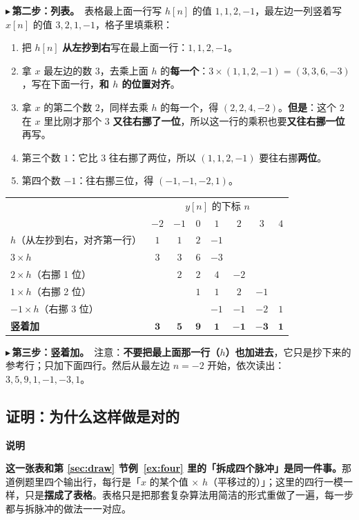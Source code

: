\documentclass[UTF8,a4paper,11pt]{ctexart}
\newenvironment{note}{\begin{notebox}\textbf{说明}\par\smallskip}{\end{notebox}}
\newcounter{ex}[section]
\newcommand{\point}[1]{\par\addvspace{1ex}\noindent\textcolor{ptteal}{$\blacktriangleright$\,\textbf{#1}}\ }
\begin{document}
\point{第二步：列表。}表格最上面一行写 $h[n]$ 的值 $1,1,2,-1$，最左边一列竖着写 $x[n]$ 的值 $3,2,1,-1$，格子里填乘积：
\begin{enumerate}[nosep]
\item 把 $h[n]$ \textbf{从左抄到右}写在最上面一行：$1,1,2,-1$。
\item 拿 $x$ 最左边的数 $3$，去乘上面 $h$ 的\textbf{每一个}：$3\times(1,1,2,-1)=(3,3,6,-3)$，写在下面一行，\textbf{和 $h$ 的位置对齐}。
\item 拿 $x$ 的第二个数 $2$，同样去乘 $h$ 的每一个，得 $(2,2,4,-2)$。\textbf{但是}：这个 $2$ 在 $x$ 里比刚才那个 $3$ \textbf{又往右挪了一位}，所以这一行的乘积也要\textbf{又往右挪一位}再写。
\item 第三个数 $1$：它比 $3$ 往右挪了两位，所以 $(1,1,2,-1)$ 要往右挪\textbf{两位}。
\item 第四个数 $-1$：往右挪三位，得 $(-1,-1,-2,1)$。
\end{enumerate}

\begin{center}
\begin{tabular}{@{}l|ccccccc@{}}
\toprule
 & \multicolumn{7}{c}{$y[n]$ 的下标 $n$}\\
 & $-2$ & $-1$ & $0$ & $1$ & $2$ & $3$ & $4$\\
\midrule
$h$（从左抄到右，对齐第一行） & $1$ & $1$ & $2$ & $-1$ & & & \\
\midrule
$3\times h$ & $3$ & $3$ & $6$ & $-3$ & & & \\
$2\times h$（右挪 1 位） & & $2$ & $2$ & $4$ & $-2$ & & \\
$1\times h$（右挪 2 位） & & & $1$ & $1$ & $2$ & $-1$ & \\
$-1\times h$（右挪 3 位） & & & & $-1$ & $-1$ & $-2$ & $1$\\
\midrule
\textbf{竖着加} & $\mathbf{3}$ & $\mathbf{5}$ & $\mathbf{9}$ & $\mathbf{1}$ & $\mathbf{-1}$ & $\mathbf{-3}$ & $\mathbf{1}$\\
\bottomrule
\end{tabular}
\end{center}

\point{第三步：竖着加。}注意：\textbf{不要把最上面那一行（$h$）也加进去}，它只是抄下来的参考行；只加下面四行。然后从最左边 $n=-2$ 开始，依次读出：$3,5,9,1,-1,-3,1$。

\subsection{证明：为什么这样做是对的}
\begin{note}
\textbf{这一张表和第 \ref{sec:draw} 节例~\ref{ex:four} 里的「拆成四个脉冲」是同一件事。}那道例题里四个输出行，每行是「$x$ 的某个值 $\times$ $h$（平移过的）」；这里的四行一模一样，只是\textbf{摆成了表格}。表格只是把那套复杂算法用简洁的形式重做了一遍，每一步都与拆脉冲的做法一一对应。
\end{note}
\end{document}
